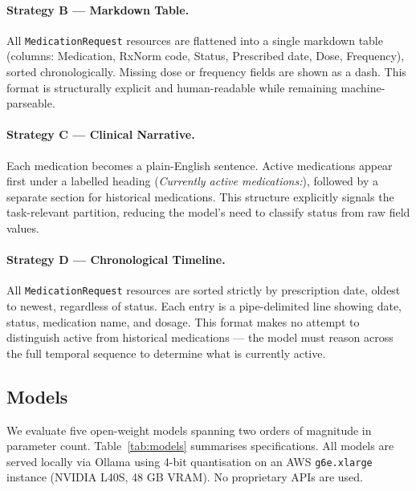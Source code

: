 \paragraph{Strategy B — Markdown Table.}
All \texttt{MedicationRequest} resources are flattened into a single markdown table
(columns: Medication, RxNorm code, Status, Prescribed date, Dose, Frequency), sorted
chronologically. Missing dose or frequency fields are shown as a dash. This format is
structurally explicit and human-readable while remaining machine-parseable.

\paragraph{Strategy C — Clinical Narrative.}
Each medication becomes a plain-English sentence. Active medications appear first under
a labelled heading (\textit{Currently active medications:}), followed by a separate
section for historical medications. This structure explicitly signals the task-relevant
partition, reducing the model's need to classify status from raw field values.

\paragraph{Strategy D — Chronological Timeline.}
All \texttt{MedicationRequest} resources are sorted strictly by prescription date,
oldest to newest, regardless of status. Each entry is a pipe-delimited line showing
date, status, medication name, and dosage. This format makes no attempt to distinguish
active from historical medications — the model must reason across the full temporal
sequence to determine what is currently active.

\subsection{Models}
\label{sec:models}

We evaluate five open-weight models spanning two orders of magnitude in parameter count.
Table~\ref{tab:models} summarises specifications. All models are served locally via
Ollama using 4-bit quantisation on an AWS \texttt{g6e.xlarge} instance
(NVIDIA L40S, 48 GB VRAM). No proprietary APIs are used.

